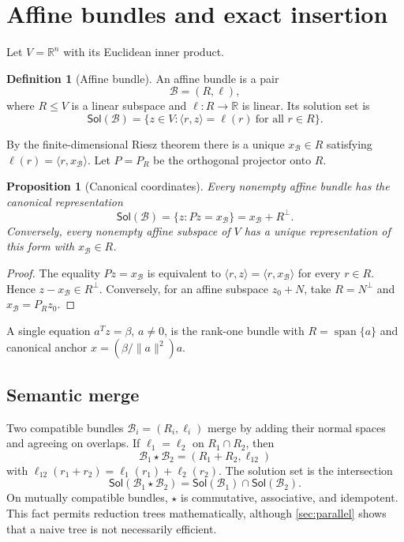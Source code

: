 \documentclass[11pt]{article}
\newtheorem{proposition}[theorem]{Proposition}
\theoremstyle{definition}
\newtheorem{definition}[theorem]{Definition}
\newcommand{\R}{\mathbb{R}}
\newcommand{\Bun}{\mathcal{B}}
\newcommand{\Sol}{\mathsf{Sol}}
\newcommand{\Span}{\operatorname{span}}
\newcommand{\orth}{\perp}
\begin{document}
\section{Affine bundles and exact insertion}
Let \(V=\R^n\) with its Euclidean inner product.

\begin{definition}[Affine bundle]
An affine bundle is a pair
\[
\Bun=(R,\ell),
\]
where \(R\le V\) is a linear subspace and \(\ell:R\to\R\) is linear. Its solution set is
\[
\Sol(\Bun)=\{z\in V:\langle r,z\rangle=\ell(r)\ \text{for all }r\in R\}.
\]
\end{definition}

By the finite-dimensional Riesz theorem there is a unique \(x_\Bun\in R\) satisfying \(\ell(r)=\langle r,x_\Bun\rangle\). Let \(P=P_R\) be the orthogonal projector onto \(R\).

\begin{proposition}[Canonical coordinates]
Every nonempty affine bundle has the canonical representation
\[
\Sol(\Bun)=\{z:Pz=x_\Bun\}=x_\Bun+R^\orth.
\]
Conversely, every nonempty affine subspace of \(V\) has a unique representation of this form with \(x_\Bun\in R\).
\end{proposition}

\begin{proof}
The equality \(Pz=x_\Bun\) is equivalent to \(\langle r,z\rangle=\langle r,x_\Bun\rangle\) for every \(r\in R\). Hence \(z-x_\Bun\in R^\orth\). Conversely, for an affine subspace \(z_0+N\), take \(R=N^\orth\) and \(x_\Bun=P_Rz_0\).
\end{proof}

A single equation \(a^Tz=\beta\), \(a\neq0\), is the rank-one bundle with \(R=\Span\{a\}\) and canonical anchor \(x=(\beta/\|a\|^2)a\).

\subsection{Semantic merge}
Two compatible bundles \(\Bun_i=(R_i,\ell_i)\) merge by adding their normal spaces and agreeing on overlaps. If \(\ell_1=\ell_2\) on \(R_1\cap R_2\), then
\[
\Bun_1\star\Bun_2=(R_1+R_2,\ell_{12})
\]
with \(\ell_{12}(r_1+r_2)=\ell_1(r_1)+\ell_2(r_2)\). The solution set is the intersection
\[
\Sol(\Bun_1\star\Bun_2)=\Sol(\Bun_1)\cap\Sol(\Bun_2).
\]
On mutually compatible bundles, \(\star\) is commutative, associative, and idempotent. This fact permits reduction trees mathematically, although \cref{sec:parallel} shows that a naive tree is not necessarily efficient.
\end{document}
